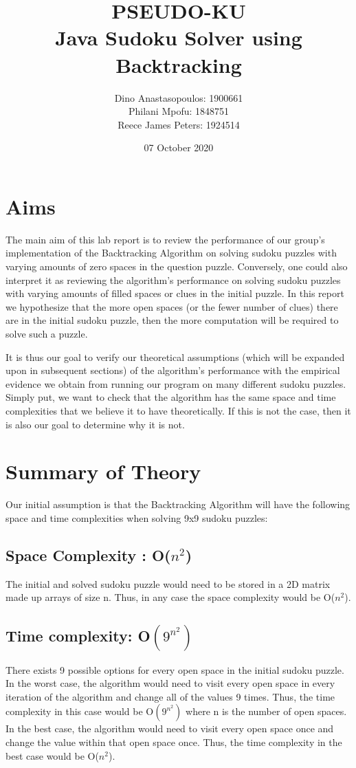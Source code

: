 \documentclass{article}
\author{
  Dino Anastasopoulos: 1900661 \\
  Philani Mpofu: 1848751\\
  Reece James Peters: 1924514
}
\title{
  PSEUDO-KU\\
  Java Sudoku Solver using Backtracking
}
\date{07 October 2020}
\begin{document}
    \begin{titlepage}
        \maketitle{}
    \end{titlepage}
    
    \tableofcontents

    \pagebreak 
    \section{Aims}
    The main aim of this lab report is to review the performance of our group’s implementation of the Backtracking Algorithm on solving sudoku puzzles with varying amounts of zero spaces in the question puzzle. Conversely, one could also interpret it as reviewing the algorithm’s performance on solving sudoku puzzles with varying amounts of filled spaces or clues in the initial puzzle. In this report we hypothesize that the more open spaces (or the fewer number of clues) there are in the initial sudoku puzzle, then the more computation will be required to solve such a puzzle. 


    It is thus our goal to verify our theoretical assumptions (which will be expanded upon in subsequent sections) of the algorithm’s performance with the empirical evidence we obtain from running our program on many different sudoku puzzles. Simply put, we want to check that the algorithm has the same space and time complexities that we believe it to have theoretically. If this is not the case, then it is also our goal to determine why it is not. 


    \section{Summary of Theory}
    Our initial assumption is that the Backtracking Algorithm will have the following space and time complexities when solving 9x9 sudoku puzzles:


    \subsection{Space Complexity : O($n^2$)}
    The initial and solved sudoku puzzle would need to be stored in a 2D matrix made up arrays of size n. Thus, in any case the space complexity would be O($n^2$). \cite{GeeksforGeeks}


    \subsection{Time complexity: O$(9^{n^2})$} 
    There exists 9 possible options for every open space in the initial sudoku puzzle. In the worst case, the algorithm would need to visit every open space in every iteration of the algorithm and change all of the values 9 times. Thus, the time complexity in this case would be O$(9^{n^2})$ where n is the number of open spaces. In the best case, the algorithm would need to visit every open space once and change the value within that open space once. Thus, the time complexity in the best case would be O($n^2$). \cite{GeeksforGeeks}
    
\end{document}
